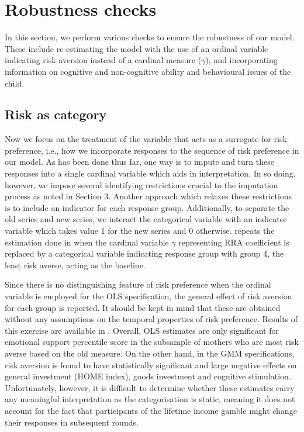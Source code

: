 \documentclass[emulatestandardclasses, 10pt, abstract = true]{scrartcl}
\begin{document}

\section{Robustness checks}
In this section, we perform various checks to ensure the robustness of our model. These include re-estimating the model with the use of an ordinal variable indicating risk aversion instead of a cardinal measure ($\gamma$), and incorporating information on cognitive and non-cognitive ability and behavioural issues of the child. 

\subsection{Risk as category}
Now we focus on the treatment of the variable that acts as a surrogate for risk preference, i.e., how we incorporate responses to the sequence of risk preference in our model. As has been done thus far, one way is to impute and turn these responses into a single cardinal variable which aids in interpretation. In so doing, however, we impose several identifying restrictions crucial to the imputation process as noted in Section 3. Another approach which relaxes these restrictions is to include an indicator for each response group. Additionally, to separate the old series and new series, we interact the categorical variable with an indicator variable which takes value 1 for the new series and 0 otherwise.  repeats the estimation done in  when the cardinal variable $\gamma$ representing RRA coefficient is replaced by a categorical variable indicating response group with group 4, the least risk averse, acting as the baseline. 

Since there is no distinguishing feature of risk preference when the ordinal variable is employed for the OLS specification, the general effect of risk aversion for each group is reported. It should be kept in mind that these are obtained without any assumptions on the temporal properties of risk preference. Results of this exercise are available in . Overall, OLS estimates are only significant for emotional support percentile score in the subsample of mothers who are most risk averse based on the old measure. On the other hand, in the GMM specifications, risk  aversion is found to have statistically significant and large negative effects on general investment (HOME index), goods investment and cognitive stimulation. Unfortunately, however, it is difficult to determine whether these estimates carry any meaningful interpretation as the categorisation is static, meaning it does not account for the fact that participants of the lifetime income gamble might change their responses in subsequent rounds.
\end{document}

